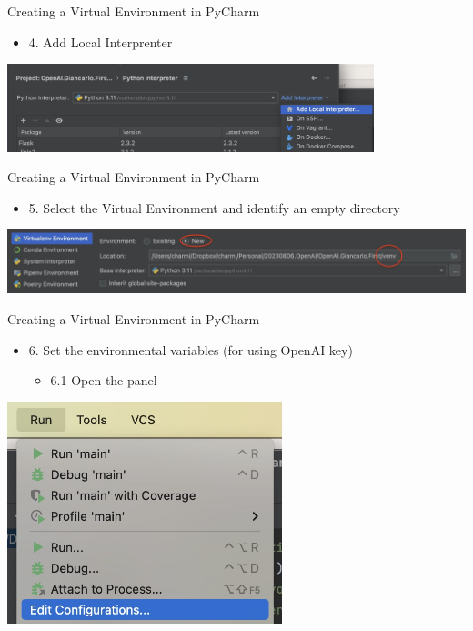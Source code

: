 \documentclass{beamer}
\begin{document}
\begin{frame}
{\centerline{Creating a Virtual Environment in PyCharm}}
\begin{itemize}
    \item 4. Add Local Interprenter
\end{itemize} 
\begin{center}
    \includegraphics[width=0.8\textwidth]{Coding/PyCharm.AddLocalInterpreter.jpg}
\end{center}
\end{frame}

\begin{frame}
{\centerline{Creating a Virtual Environment in PyCharm}}
\begin{itemize}
    \item 5. Select the Virtual Environment and identify an empty directory
\end{itemize} 
\begin{center}
    \includegraphics[width=\textwidth]{Coding/PyCharm.VirtualEnvironment.jpg}
\end{center}
\end{frame}

\begin{frame}
{\centerline{Creating a Virtual Environment in PyCharm}}
\begin{itemize}
    \item 6. Set the environmental variables (for using OpenAI key) 
    \begin{itemize}
    \item 6.1 Open the panel
    \end{itemize} 
\end{itemize} 
\begin{center}
    \includegraphics[width=0.6\textwidth]{Coding/PyCharm.RunEditConfigurations.jpg}
\end{center}
\end{frame}
\end{document}
